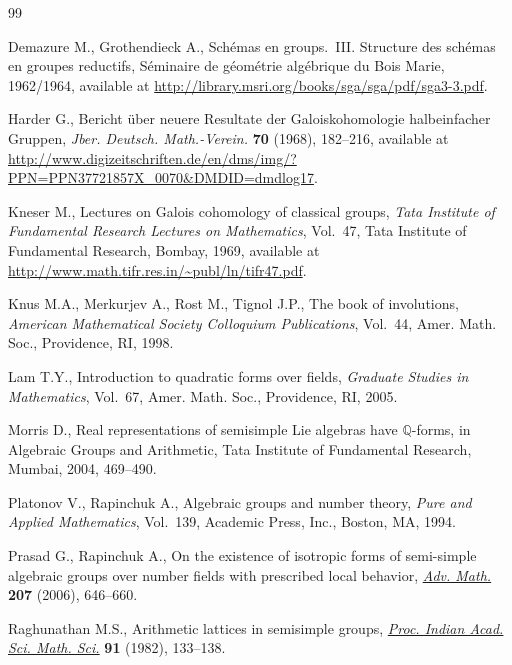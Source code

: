 \documentclass[10pt,a4paper]{amsart}
\numberwithin{equation}{section}
\begin{document}
\begin{thebibliography}{99}
\footnotesize\itemsep=0pt

Demazure M., Grothendieck A., Sch\'emas en groups.~III. Structure des sch\'emas
  en groupes reductifs, S\'eminaire de g\'eom\'etrie alg\'ebrique du {B}ois
  {M}arie, 1962/1964, available at
  \url{http://library.msri.org/books/sga/sga/pdf/sga3-3.pdf}.

Harder G., Bericht \"uber neuere {R}esultate der {G}aloiskohomologie
  halbeinfacher {G}ruppen, \textit{Jber. Deutsch. Math.-Verein.} \textbf{70}
  (1968), 182--216, available at
  \url{http://www.digizeitschriften.de/en/dms/img/?PPN=PPN37721857X_0070&DMDID=dmdlog17}.

Kneser M., Lectures on {G}alois cohomology of classical groups, \textit{Tata
  Institute of Fundamental Research Lectures on Mathematics}, Vol.~47, Tata
  Institute of Fundamental Research, Bombay, 1969, available at
  \url{http://www.math.tifr.res.in/~publ/ln/tifr47.pdf}.

Knus M.A., Merkurjev A., Rost M., Tignol J.P., The book of involutions,
  \textit{American Mathematical Society Colloquium Publications}, Vol.~44,
  Amer. Math. Soc., Providence, RI, 1998.

Lam T.Y., Introduction to quadratic forms over f\/ields, \textit{Graduate Studies
  in Mathematics}, Vol.~67, Amer. Math. Soc., Providence, RI, 2005.

Morris D., Real representations of semisimple {L}ie algebras have {${\mathbb
  Q}$}-forms, in Algebraic Groups and Arithmetic, Tata Institute of Fundamental
  Research, Mumbai, 2004, 469--490.

Platonov V., Rapinchuk A., Algebraic groups and number theory, \textit{Pure and
  Applied Mathematics}, Vol.~139, Academic Press, Inc., Boston, MA, 1994.

Prasad G., Rapinchuk A., On the existence of isotropic forms of semi-simple
  algebraic groups over number f\/ields with prescribed local behavior,
  \href{http://dx.doi.org/10.1016/j.aim.2006.01.001}{\textit{Adv. Math.}} \textbf{207} (2006), 646--660.

Raghunathan M.S., Arithmetic lattices in semisimple groups, \href{http://dx.doi.org/10.1007/BF02967980}{\textit{Proc.
  Indian Acad. Sci. Math. Sci.}} \textbf{91} (1982), 133--138.


\end{thebibliography}
\end{document}
